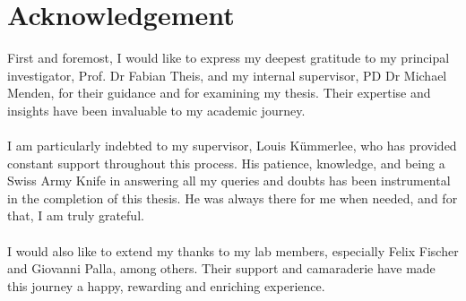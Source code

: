 \documentclass[12pt,a4paper]{article}
\newcommand{\mysupervisor}{Prof. Dr Fabian Theis}
\newcommand{\myinternalsupervisor}{PD Dr Michael Menden}
\begin{document}
\newpage

    
%
%
%
%
%
%
%
    

\RaggedRight


\newpage

\newpage

\section{Acknowledgement}
\label{Acknowledgement}

First and foremost, I would like to express my deepest gratitude to my principal investigator, \mysupervisor{}, and my internal supervisor, \myinternalsupervisor{}, for their guidance and for examining my thesis. Their expertise and insights have been invaluable to my academic journey.
\paragraph{}
I am particularly indebted to my supervisor, Louis Kümmerlee, who has provided constant support throughout this process. His patience, knowledge, and being a Swiss Army Knife in answering all my queries and doubts has been instrumental in the completion of this thesis. He was always there for me when needed, and for that, I am truly grateful.
\paragraph{}
I would also like to extend my thanks to my lab members, especially Felix Fischer and Giovanni Palla, among others. Their support and camaraderie have made this journey a happy, rewarding and enriching experience.
\end{document}
